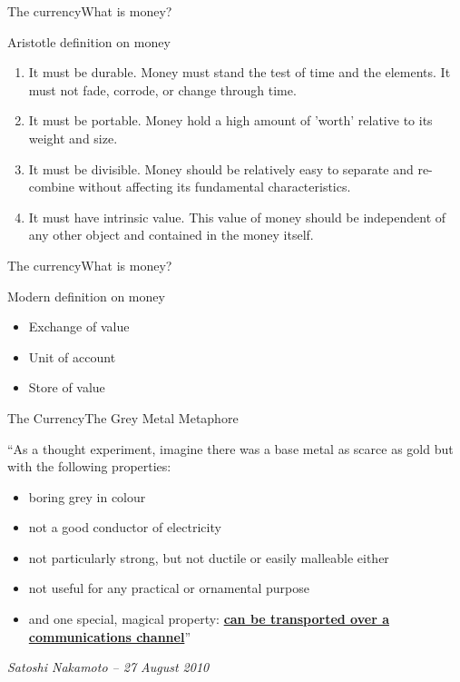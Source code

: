 \documentclass[english,compress]{beamer}
\newcommand{\powemph}[1]{\textbf{\underline{#1}}}
\begin{document}
\begin{frame}{The currency}{What is money?}
\begin{exampleblock}{Aristotle definition on money}
\begin{enumerate}
 \item It must be durable. Money must stand the test of time
 and the elements. It must not fade, corrode, or change through time.
 \item It must be portable. Money hold a high amount of 'worth' relative to its weight and size.
 \item It must be divisible. Money should be relatively easy to separate
 and re-combine without affecting its fundamental characteristics.
 \item It must have intrinsic value. This value of money should be independent 
 of any other object and contained in the money itself.
\end{enumerate}
\end{exampleblock}
\end{frame}

\begin{frame}{The currency}{What is money?}

\begin{exampleblock}{Modern definition on money}
\begin{itemize}
 \item Exchange of value
 \item Unit of account
 \item Store of value
\end{itemize}
\end{exampleblock}
\end{frame}




\begin{frame}{The Currency}{The Grey Metal Metaphore}

``As a thought experiment, imagine there was a base metal as scarce as gold but with the following properties:

\begin{itemize}
 \item boring grey in colour
 \item not a good conductor of electricity
 \item not particularly strong, but not ductile or easily malleable either
 \item not useful for any practical or ornamental purpose
 \item and one special, magical property: \powemph{can be transported over a communications channel}''
\end{itemize}

\em{Satoshi Nakamoto -- 27 August 2010}
\end{frame}
\end{document}
